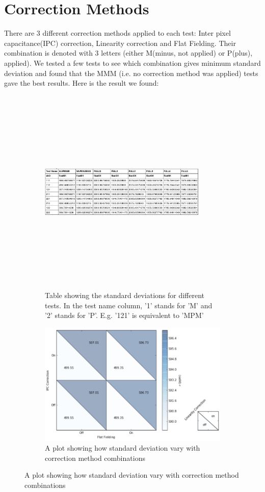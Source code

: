 \documentclass[conference]{IEEEtran}
\begin{document}
\section{Correction Methods}
There are 3 different correction methods applied to each test: Inter pixel capacitance(IPC) correction, Linearity correction and Flat Fielding. Their combination is denoted with 3 letters (either M(minus, not applied) or P(plus), applied). We tested a few tests to see which combination gives minimum standard deviation and found that the MMM (i.e. no correction method was applied) tests gave the best results. Here is the result we found:  
\begin{figure}[H]
    \centering
    \begin{subfigure}{1}
        \includegraphics[width=8cm,height=10cm,keepaspectratio]{correction}
        \caption{Table showing the standard deviations for different tests. In the test name column, '1' stands for 'M' and '2' stands for 'P'. E.g. '121' is equivalent to 'MPM'}
    \end{subfigure}

    \begin{subfigure}{2}
        \includegraphics[scale=0.6]{correction1}
        \caption{A plot showing how standard deviation vary with correction method combinations}
    \end{subfigure}
\end{figure}
\end{document}
